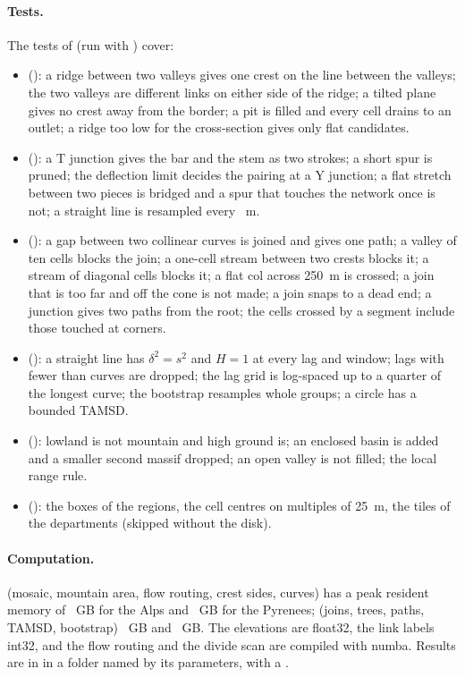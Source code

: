 \paragraph{Tests.} The \CgNTests{} tests of  (run with ) cover:
\begin{itemize}[nosep]
  \item {} (\CgNTestsRidges): a ridge between two valleys gives one crest on the line between the valleys; the two valleys are different links on either side of the ridge; a tilted plane gives no crest
        away from the border; a pit is filled and every cell drains to an outlet; a ridge too low for the cross-section gives only flat candidates.
  \item {} (\CgNTestsCurves): a T junction gives the bar and the stem as two strokes; a short spur is pruned; the deflection limit decides the pairing at a Y junction; a flat stretch between two pieces is bridged
        and a spur that touches the network once is not; a straight line is resampled every \CgPStep~m.
  \item {} (\CgNTestsJoined): a gap between two collinear curves is joined and gives one path; a valley of ten cells blocks the join; a one-cell stream between two crests blocks it; a stream of diagonal cells blocks
        it; a flat col across 250~m is crossed; a join that is too far and off the cone is not made; a join snaps to a dead end; a junction gives two paths from the root; the cells crossed by a segment include those touched at corners.
  \item {} (\CgNTestsTamsd): a straight line has $\delta^2=s^2$ and $H=1$ at every lag and window; lags with fewer than \CgPMinCurves{} curves are dropped; the lag grid is log-spaced up to a quarter of the longest curve; the
        bootstrap resamples whole groups; a circle has a bounded TAMSD.
  \item {} (\CgNTestsMountains): lowland is not mountain and high ground is; an enclosed basin is added and a smaller second massif dropped; an open valley is not filled; the local range rule.
  \item {} (\CgNTestsGeo): the boxes of the regions, the cell centres on multiples of 25~m, the tiles of the departments (skipped without the disk).
\end{itemize}

\paragraph{Computation.}  (mosaic, mountain area, flow routing, crest sides, curves) has a peak resident memory of \CgAlpsRamDrain~GB for the Alps and \CgPyrRamDrain~GB for the Pyrenees;  (joins, trees,
paths, TAMSD, bootstrap) \CgAlpsRamHgeo~GB and \CgPyrRamHgeo~GB. The elevations are float32, the link labels int32, and the flow routing and the divide scan are compiled with numba. Results are in
 in a folder named by its parameters, with a .
